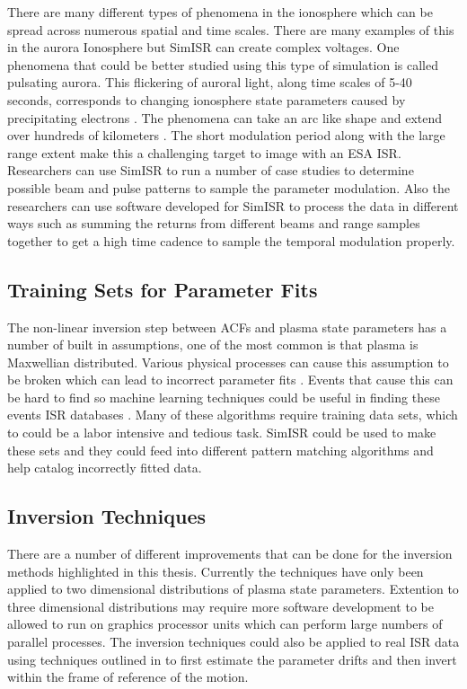 There are many different types of phenomena in the ionosphere which can be spread across numerous spatial and time scales. There are many examples of this in the aurora Ionosphere but SimISR can create complex voltages. One phenomena that could be better studied using this type of simulation is called pulsating aurora. This flickering of auroral light, along time scales of 5-40 seconds, corresponds to changing ionosphere state parameters caused by precipitating electrons \cite{JGRA:JGRA21510}. The phenomena can take an arc like shape and extend over hundreds of kilometers \cite{JGRA:JGRA20202}. The short modulation period along with the large range extent make this a challenging target to image with an ESA ISR. Researchers can use SimISR to run a number of case studies to determine possible beam and pulse patterns to sample the parameter modulation. Also the researchers can use software developed for SimISR to process the data in different ways such as summing the returns from different beams and range samples together to get a high time cadence to sample the temporal modulation properly. 


\subsection{Training Sets for Parameter Fits}

The non-linear inversion step between ACFs and plasma state parameters has a number of built in assumptions, one of the most common is that plasma is Maxwellian distributed. Various physical processes can cause this assumption to be broken which can lead to incorrect parameter fits \cite{St1979ion,Suvanto1988incoherent,Akbari:2015fv}. Events that cause this can be hard to find so machine learning techniques could be useful in finding these events ISR databases \cite{Duda:2000:PC:954544}. Many of these algorithms require training data sets, which to could be a labor intensive and tedious task. SimISR could be used to make these sets and they could feed into different pattern matching algorithms and help catalog incorrectly fitted data.

\subsection{Inversion Techniques}

There are a number of different improvements that can be done for the inversion methods highlighted in this thesis. Currently the techniques have only been applied to two dimensional distributions of plasma state parameters. Extention to three dimensional distributions may require more software development to be allowed to run on graphics processor units which can perform large numbers of parallel processes. The inversion techniques could also be applied to real ISR data using techniques outlined in \cite{butler:imagingfregiondrifts} to first estimate the parameter drifts and then invert within the frame of reference of the motion.

